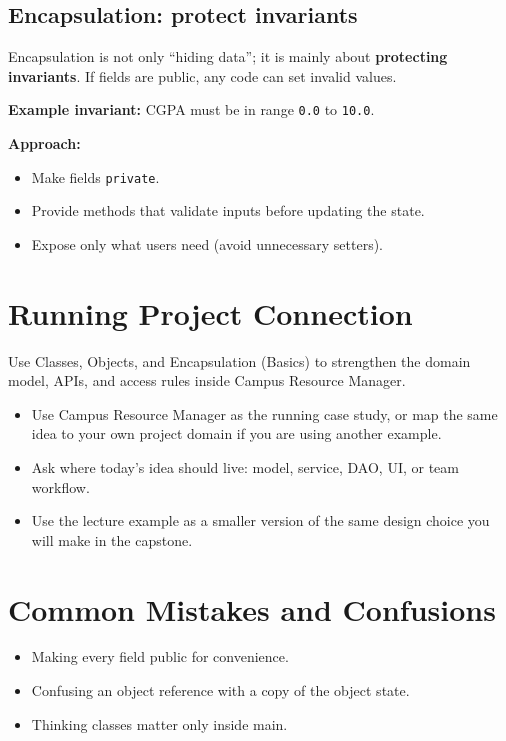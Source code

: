 \documentclass[11pt]{article}
\begin{document}
\subsection{Encapsulation: protect invariants}
Encapsulation is not only ``hiding data''; it is mainly about \textbf{protecting invariants}.
If fields are public, any code can set invalid values.

\textbf{Example invariant:} CGPA must be in range \texttt{0.0} to \texttt{10.0}.

\textbf{Approach:}
\begin{itemize}
  \item Make fields \texttt{private}.
  \item Provide methods that validate inputs before updating the state.
  \item Expose only what users need (avoid unnecessary setters).
\end{itemize}
\notesources{\OOPSUnitIISources}

\section{Running Project Connection}
Use Classes, Objects, and Encapsulation (Basics) to strengthen the domain model, APIs, and access rules inside Campus Resource Manager.
\begin{itemize}
  \item Use Campus Resource Manager as the running case study, or map the same idea to your own project domain if you are using another example.
  \item Ask where today's idea should live: model, service, DAO, UI, or team workflow.
  \item Use the lecture example as a smaller version of the same design choice you will make in the capstone.
\end{itemize}
\notesources{\OOPSUnitIISources}

\section{Common Mistakes and Confusions}
\begin{itemize}
  \item Making every field public for convenience.
  \item Confusing an object reference with a copy of the object state.
  \item Thinking classes matter only inside main.
\end{itemize}
\notesources{\OOPSUnitIISources}
\end{document}
